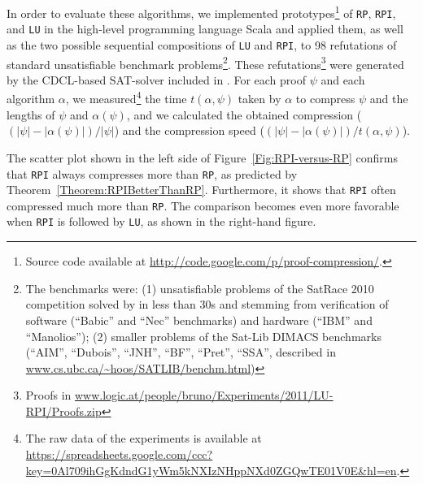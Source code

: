 \documentclass[envcountsame]{llncs}
\newcommand{\RP}{\texttt{\upshape RP}}
\newcommand{\RPI}{\texttt{\upshape RPI}}
\newcommand{\LU}{\texttt{\upshape LU}}
\begin{document}
In order to evaluate these algorithms, we implemented prototypes\footnote{Source
  code available at \url{http://code.google.com/p/proof-compression/}.} of {\RP}, {\RPI}, and {\LU} in the high-level programming language Scala \cite{OderskySpoonVenners2008Programming-in-Scala} and applied them, as well as the two possible sequential compositions of {\LU} and {\RPI}, to 98 refutations of standard unsatisfiable benchmark problems\footnote{The benchmarks were: (1) unsatisfiable problems of the SatRace 2010 competition solved by {\verit} in less than 30s and stemming from verification of software  (``Babic'' and ``Nec'' benchmarks) and hardware (``IBM'' and ``Manolios''); (2) smaller problems of the Sat-Lib DIMACS benchmarks (``AIM'', ``Dubois'', ``JNH'', ``BF'', ``Pret'', ``SSA'', described in \url{www.cs.ubc.ca/~hoos/SATLIB/benchm.html})}. These refutations\footnote{Proofs in \url{www.logic.at/people/bruno/Experiments/2011/LU-RPI/Proofs.zip}} were generated by the CDCL-based SAT-solver included in {\verit} \cite{BoutonCaminha-B.-de-OliveiraDeharbeFontaine2009veriT:-an-open-trustable-and-efficient-SMT-Solver}. 
For each proof $\psi$ and each algorithm $\alpha$, we measured\footnote{The raw data of the experiments is available at \url{https://spreadsheets.google.com/ccc?key=0Al709ihGgKdndG1yWm5kNXIzNHppNXd0ZGQwTE01V0E&hl=en}.} the time $t(\alpha,\psi)$ taken by $\alpha$ to compress $\psi$ and the lengths of $\psi$ and $\alpha(\psi)$, and we calculated the obtained compression ($(|\psi| - |\alpha(\psi)|)/|\psi|$) and the compression speed ($(|\psi| - |\alpha(\psi)|)/t(\alpha,\psi)$).

The scatter plot shown in the left side of Figure~\ref{Fig:RPI-versus-RP} 
confirms that {\RPI} always compresses more than {\RP}, as predicted by
Theorem~\ref{Theorem:RPIBetterThanRP}. Furthermore, it shows that {\RPI} often
compressed much more than {\RP}. The comparison becomes even more favorable when
{\RPI} is followed by {\LU}, as shown in the right-hand figure.
\end{document}
